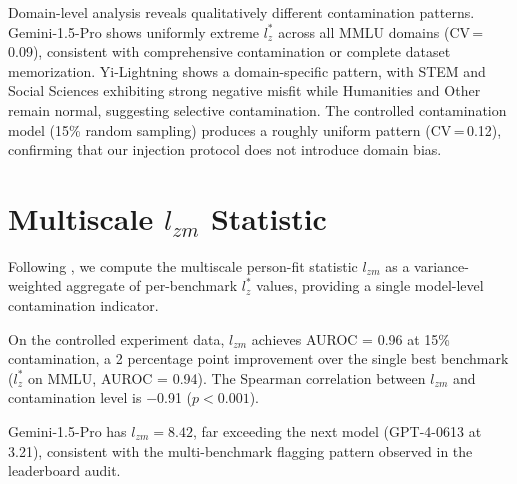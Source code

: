 \documentclass[11pt,a4paper]{article}
\begin{document}
Domain-level analysis reveals qualitatively different contamination patterns.
Gemini-1.5-Pro shows uniformly extreme $l_z^*$ across all MMLU domains (CV\,=\,0.09), consistent with comprehensive contamination or complete dataset memorization.
Yi-Lightning shows a domain-specific pattern, with STEM and Social Sciences exhibiting strong negative misfit while Humanities and Other remain normal, suggesting selective contamination.
The controlled contamination model (15\% random sampling) produces a roughly uniform pattern (CV\,=\,0.12), confirming that our injection protocol does not introduce domain bias.

\section{Multiscale $l_{zm}$ Statistic}
\label{app:lzm}

Following \citet{hong2021multiscale}, we compute the multiscale person-fit statistic $l_{zm}$ as a variance-weighted aggregate of per-benchmark $l_z^*$ values, providing a single model-level contamination indicator.

On the controlled experiment data, $l_{zm}$ achieves AUROC = 0.96 at 15\% contamination, a 2 percentage point improvement over the single best benchmark ($l_z^*$ on MMLU, AUROC = 0.94).
The Spearman correlation between $l_{zm}$ and contamination level is $-$0.91 ($p < 0.001$).

Gemini-1.5-Pro has $l_{zm} = 8.42$, far exceeding the next model (GPT-4-0613 at 3.21), consistent with the multi-benchmark flagging pattern observed in the leaderboard audit.
\end{document}
